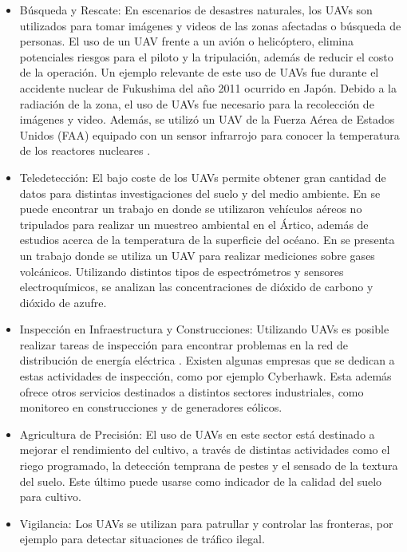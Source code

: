 \begin{itemize}
    \item Búsqueda y Rescate: En escenarios de desastres naturales, los UAVs son utilizados para tomar imágenes y videos de las zonas afectadas o búsqueda de personas. El uso de un UAV frente a un avión o helicóptero, elimina potenciales riesgos para el piloto y la tripulación, además de reducir el costo de la operación. Un ejemplo relevante de este uso de UAVs fue durante el accidente nuclear de Fukushima del año 2011 ocurrido en Japón. Debido a la radiación de la zona, el uso de UAVs fue necesario para la recolección de imágenes y video. Además, se utilizó un UAV de la Fuerza Aérea de Estados Unidos (FAA) equipado con un sensor infrarrojo para conocer la temperatura de los reactores nucleares \cite{adams2011survey}.
    \item Teledetección: El bajo coste de los UAVs permite obtener gran cantidad de datos para distintas investigaciones del suelo y del medio ambiente. En \cite{villa2016overview} se puede encontrar un trabajo en donde se utilizaron vehículos aéreos no tripulados para realizar un muestreo ambiental en el Ártico, además de estudios acerca de la temperatura de la superficie del océano. En \cite{mcgonigle2008unmanned} se presenta un trabajo donde se utiliza un UAV para realizar mediciones sobre gases volcánicos. Utilizando distintos tipos de espectrómetros y sensores electroquímicos, se analizan las concentraciones de dióxido de carbono y dióxido de azufre.
    \item Inspección en Infraestructura y Construcciones: Utilizando UAVs es posible realizar tareas de inspección para encontrar problemas en la red de distribución de energía eléctrica \cite{luque2014power}. Existen algunas empresas que se dedican a estas actividades de inspección, como por ejemplo Cyberhawk. Esta además ofrece otros servicios destinados a distintos sectores industriales, como monitoreo en construcciones y de generadores eólicos.
    \item Agricultura de Precisión: El uso de UAVs en este sector está destinado a mejorar el rendimiento del cultivo, a través de distintas actividades como el riego programado, la detección temprana de pestes y el sensado de la textura del suelo. Este último puede usarse como indicador de la calidad del suelo para cultivo.
    \item Vigilancia: Los UAVs se utilizan para patrullar y controlar las fronteras, por ejemplo para detectar situaciones de tráfico ilegal.
\end{itemize}

